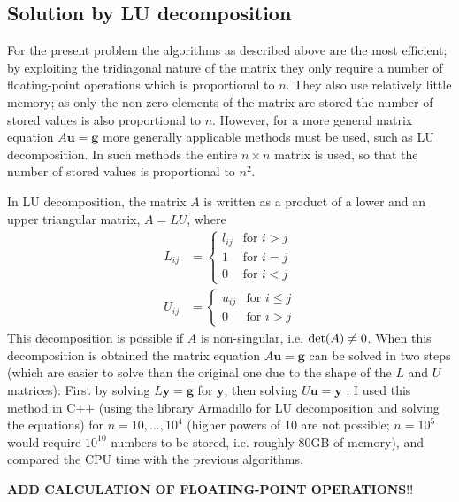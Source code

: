 \documentclass[a4paper,english]{article}
\renewcommand\vec{\mathbf}
\let\originalleft\left
\let\originalright\right
\renewcommand{\left}{\mathopen{}\mathclose\bgroup\originalleft}
\renewcommand{\right}{\aftergroup\egroup\originalright}
\begin{document}
\subsection{Solution by LU decomposition}
For the present problem the algorithms as described above are the most efficient; by exploiting the tridiagonal nature of the matrix they only require a number of floating-point operations which is proportional to $n$. They also use relatively little memory; as only the non-zero elements of the matrix are stored the number of stored values is also proportional to $n$. However, for a more general matrix equation $A\vec{u} = \vec{g}$ more generally applicable methods must be used, such as LU decomposition. In such methods the entire $n\times n$ matrix is used, so that the number of stored values is proportional to $n^2$. \par
In LU decomposition, the matrix $A$ is written as a product of a lower and an upper triangular matrix, $A=LU$, where \cite{lecturenotes}
\begin{align}
  L_{ij} &=
  \begin{cases}
    l_{ij} & \text{for }i>j \\
    1 & \text{for } i = j \\
    0 & \text{for } i < j
  \end{cases} \\
  U_{ij} &=
  \begin{cases}
    u_{ij} & \text{for } i \leq j \\
    0 & \text{for } i > j
  \end{cases}
\end{align}
This decomposition is possible if $A$ is non-singular, i.e. $\text{det}\left(A\right) \neq 0$. When this decomposition is obtained the matrix equation $A\vec{u} = \vec{g}$ can be solved in two steps (which are easier to solve than the original one due to the shape of the $L$ and $U$ matrices): First by solving $L\vec{y} = \vec{g}$ for $\vec{y}$, then solving $U\vec{u} = \vec{y}$ \cite{lecturenotes}. I used this method in C++ (using the library Armadillo\cite{armadillo1}\cite{armadillo2} for LU decomposition and solving the equations) for $n=10, \dots, 10^4$ (higher powers of 10 are not possible; $n=10^5$ would require $10^{10}$ numbers to be stored, i.e. roughly $80\text{GB}$ of memory), and compared the CPU time with the previous algorithms.\par
\textbf{ADD CALCULATION OF FLOATING-POINT OPERATIONS}!!
\end{document}
